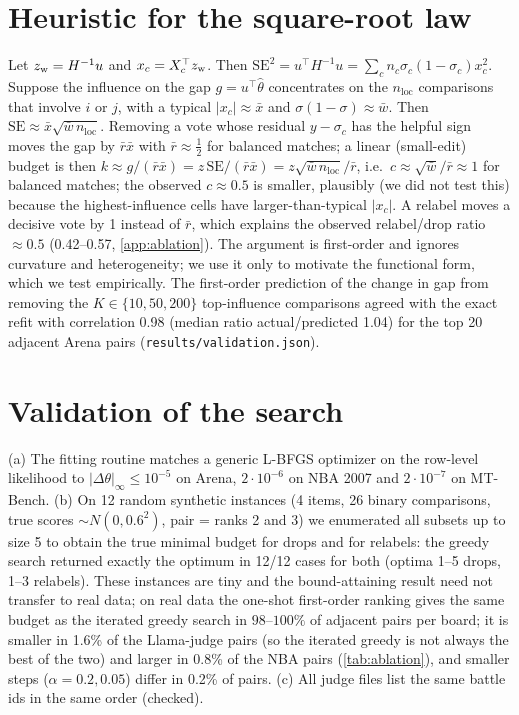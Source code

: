 \documentclass{article}
\theoremstyle{plain}
\theoremstyle{remark}
\newcommand{\nloc}{n_{\mathrm{loc}}}
\begin{document}
\section{Heuristic for the square-root law}\label{app:heuristic}
Let $z_{\rm w}=H^{-1}u$ and $x_c=X_c^\top z_{\rm w}$. Then $\mathrm{SE}^2=u^\top H^{-1}u=\sum_c n_c\sigma_c(1-\sigma_c)x_c^2$. Suppose the influence on the gap $g=u^\top\hat\theta$ concentrates on the $\nloc$ comparisons that involve $i$ or $j$, with a typical $|x_c|\approx\bar x$ and $\sigma(1-\sigma)\approx\bar w$. Then $\mathrm{SE}\approx\bar x\sqrt{\bar w\,\nloc}$. Removing a vote whose residual $y-\sigma_c$ has the helpful sign moves the gap by $\bar r\bar x$ with $\bar r\approx\tfrac12$ for balanced matches; a linear (small-edit) budget is then $k\approx g/(\bar r\bar x)=z\,\mathrm{SE}/(\bar r\bar x)=z\sqrt{\bar w\,\nloc}/\bar r$, i.e.\ $c\approx\sqrt{\bar w}/\bar r\approx1$ for balanced matches; the observed $c\approx0.5$ is smaller, plausibly (we did not test this) because the highest-influence cells have larger-than-typical $|x_c|$. A relabel moves a decisive vote by 1 instead of $\bar r$, which explains the observed relabel/drop ratio $\approx0.5$ (0.42--0.57, \cref{app:ablation}). The argument is first-order and ignores curvature and heterogeneity; we use it only to motivate the functional form, which we test empirically. The first-order prediction of the change in gap from removing the $K\in\{10,50,200\}$ top-influence comparisons agreed with the exact refit with correlation 0.98 (median ratio actual/predicted 1.04) for the top 20 adjacent Arena pairs (\texttt{results/validation.json}).

\section{Validation of the search}\label{app:validation}
(a) The fitting routine matches a generic L-BFGS optimizer on the row-level likelihood to $|\Delta\theta|_\infty\le10^{-5}$ on Arena, $2\cdot10^{-6}$ on NBA 2007 and $2\cdot10^{-7}$ on MT-Bench. (b) On 12 random synthetic instances (4 items, 26 binary comparisons, true scores $\sim N(0,0.6^2)$, pair = ranks 2 and 3) we enumerated all subsets up to size 5 to obtain the true minimal budget for drops and for relabels: the greedy search returned exactly the optimum in 12/12 cases for both (optima 1--5 drops, 1--3 relabels). These instances are tiny and the bound-attaining result need not transfer to real data; on real data the one-shot first-order ranking gives the same budget as the iterated greedy search in $98$--$100\%$ of adjacent pairs per board; it is smaller in 1.6\% of the Llama-judge pairs (so the iterated greedy is not always the best of the two) and larger in 0.8\% of the NBA pairs (\cref{tab:ablation}), and smaller steps ($\alpha=0.2,0.05$) differ in 0.2\% of pairs. (c) All judge files list the same battle ids in the same order (checked).
\end{document}

